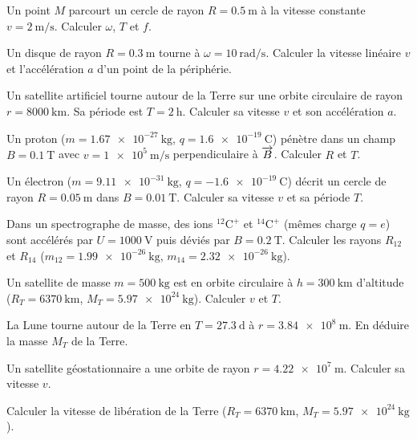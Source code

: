 
\exo{} Un point $M$ parcourt un cercle de rayon $R=\SI{0.5}{\metre}$ à la vitesse constante $v=\SI{2}{\metre\per\second}$. Calculer $\omega$, $T$ et $f$.

\exo{} Un disque de rayon $R=\SI{0.3}{\metre}$ tourne à $\omega=\SI{10}{\radian\per\second}$. Calculer la vitesse linéaire $v$ et l'accélération $a$ d'un point de la périphérie.

\exo{} Un satellite artificiel tourne autour de la Terre sur une orbite circulaire de rayon $r=\SI{8000}{\kilo\metre}$. Sa période est $T=\SI{2}{\hour}$. Calculer sa vitesse $v$ et son accélération $a$.


\exo{} Un proton ($m=\SI{1.67e-27}{\kilogram}$, $q=\SI{1.6e-19}{\coulomb}$) pénètre dans un champ $B=\SI{0.1}{\tesla}$ avec $v=\SI{1e5}{\metre\per\second}$ perpendiculaire à $\overrightarrow{B}$. Calculer $R$ et $T$.

\exo{} Un électron ($m=\SI{9.11e-31}{\kilogram}$, $q=\SI{-1.6e-19}{\coulomb}$) décrit un cercle de rayon $R=\SI{0.05}{\metre}$ dans $B=\SI{0.01}{\tesla}$. Calculer sa vitesse $v$ et sa période $T$.

\exo{} Dans un spectrographe de masse, des ions $^{12}\mathrm{C}^+$ et $^{14}\mathrm{C}^+$ (mêmes charge $q=e$) sont accélérés par $U=\SI{1000}{\volt}$ puis déviés par $B=\SI{0.2}{\tesla}$. Calculer les rayons $R_{12}$ et $R_{14}$ ($m_{12}=\SI{1.99e-26}{\kilogram}$, $m_{14}=\SI{2.32e-26}{\kilogram}$).


\exo{} Un satellite de masse $m=\SI{500}{\kilogram}$ est en orbite circulaire à $h=\SI{300}{\kilo\metre}$ d'altitude ($R_T=\SI{6370}{\kilo\metre}$, $M_T=\SI{5.97e24}{\kilogram}$). Calculer $v$ et $T$.

\exo{} La Lune tourne autour de la Terre en $T=\SI{27.3}{\day}$ à $r=\SI{3.84e8}{\metre}$. En déduire la masse $M_T$ de la Terre.

\exo{} Un satellite géostationnaire a une orbite de rayon $r=\SI{4.22e7}{\metre}$. Calculer sa vitesse $v$.


\exo{} Calculer la vitesse de libération de la Terre ($R_T=\SI{6370}{\kilo\metre}$, $M_T=\SI{5.97e24}{\kilogram}$).

